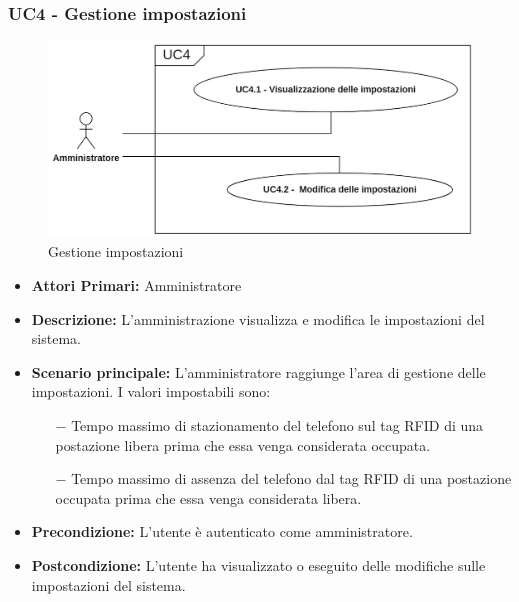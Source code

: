 \subsubsection{ UC4 - Gestione impostazioni}

\begin{figure}[H]
	\centering
	\includegraphics[width=15cm]{res/images/UC4.png}
	\caption{Gestione impostazioni}
	\label{fig:Gestione impostazioni}
\end{figure}
\begin{itemize}
           	\item\textbf{Attori Primari:} 
           	Amministratore
           	\item\textbf{Descrizione:} 
           	L'amministrazione visualizza e modifica le impostazioni del sistema.
           	\item\textbf{Scenario principale:}
           	L'amministratore raggiunge l'area di gestione delle impostazioni.
           	I valori impostabili sono:
           	\begin{itemize}
           		\item[$-$] Tempo massimo di stazionamento del telefono sul tag RFID di una postazione libera prima che essa venga considerata occupata.
           		\item[$-$] Tempo massimo di assenza del telefono dal tag RFID di una postazione occupata prima che essa venga considerata libera.
           	\end{itemize}
           	\item\textbf{Precondizione:} 
           	L'utente è autenticato come amministratore.
           	\item\textbf{Postcondizione:}
           	L'utente ha visualizzato o eseguito delle modifiche sulle impostazioni del sistema.
\end{itemize}

